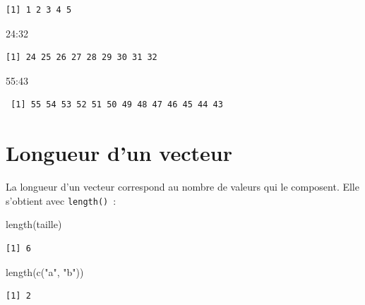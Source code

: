 \documentclass[
  letterpaper,
  DIV=11,
  numbers=noendperiod,
  oneside]{scrreprt}
\newenvironment{Shaded}{\begin{snugshade}}{\end{snugshade}}
\newcommand{\DecValTok}[1]{\textcolor[rgb]{0.68,0.00,0.00}{#1}}
\newcommand{\FunctionTok}[1]{\textcolor[rgb]{0.28,0.35,0.67}{#1}}
\newcommand{\NormalTok}[1]{\textcolor[rgb]{0.00,0.23,0.31}{#1}}
\newcommand{\SpecialCharTok}[1]{\textcolor[rgb]{0.37,0.37,0.37}{#1}}
\newcommand{\StringTok}[1]{\textcolor[rgb]{0.13,0.47,0.30}{#1}}
\begin{document}
\begin{verbatim}
[1] 1 2 3 4 5
\end{verbatim}

\begin{Shaded}
\begin{Highlighting}[]
\DecValTok{24}\SpecialCharTok{:}\DecValTok{32}
\end{Highlighting}
\end{Shaded}

\begin{verbatim}
[1] 24 25 26 27 28 29 30 31 32
\end{verbatim}

\begin{Shaded}
\begin{Highlighting}[]
\DecValTok{55}\SpecialCharTok{:}\DecValTok{43}
\end{Highlighting}
\end{Shaded}

\begin{verbatim}
 [1] 55 54 53 52 51 50 49 48 47 46 45 44 43
\end{verbatim}

\hypertarget{longueur-dun-vecteur}{%
\section{Longueur d'un vecteur}\label{longueur-dun-vecteur}}

La longueur d'un vecteur correspond au nombre de valeurs qui le
composent. Elle s'obtient avec \texttt{length()}~:

\begin{Shaded}
\begin{Highlighting}[]
\FunctionTok{length}\NormalTok{(taille)}
\end{Highlighting}
\end{Shaded}

\begin{verbatim}
[1] 6
\end{verbatim}

\begin{Shaded}
\begin{Highlighting}[]
\FunctionTok{length}\NormalTok{(}\FunctionTok{c}\NormalTok{(}\StringTok{"a"}\NormalTok{, }\StringTok{"b"}\NormalTok{))}
\end{Highlighting}
\end{Shaded}

\begin{verbatim}
[1] 2
\end{verbatim}
\end{document}
